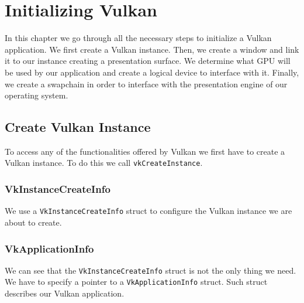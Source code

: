 \chapter{Initializing Vulkan}
\label{chap:InitializingVulkan}

In this chapter we go through all the necessary steps to initialize a
Vulkan application.
We first create a Vulkan instance.
Then, we create a window and link it to our instance creating a presentation
surface.
We determine what GPU will be used by our application and create a logical device
to interface with it.
Finally, we create a swapchain in order to interface with the presentation engine
of our operating system.

\section{Create Vulkan Instance}

To access any of the functionalities offered by Vulkan we first have to create a Vulkan
instance.
To do this we call \texttt{vkCreateInstance}.

\begin{minipage}{\linewidth}{\noindent}
    
\end{minipage}

\subsection{VkInstanceCreateInfo}

We use a \texttt{VkInstanceCreateInfo} struct to configure the Vulkan
instance we are about to create.

\begin{minipage}{\linewidth}{\noindent}

\end{minipage}

\subsection{VkApplicationInfo}

We can see that the \texttt{VkInstanceCreateInfo} struct is not the only thing we need.
We have to specify a pointer to a \texttt{VkApplicationInfo} struct.
Such struct describes our Vulkan application.

